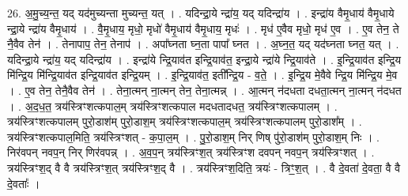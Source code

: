 \documentclass[17pt]{extarticle}
\begin{document}
26. अ॒मु॒च्य॒न्त॒ यद् यद॑मुच्यन्ता मुच्यन्त॒ यत् । . यदिन्द्रा॒ये न्द्रा॑य॒ यद् यदिन्द्रा॑य । . इन्द्रा॑य वैमृ॒धाय॑ वैमृ॒धाये न्द्रा॒ये न्द्रा॑य वैमृ॒धाय॑ । . वै॒मृ॒धाय॒ मृधो॒ मृधो॑ वैमृ॒धाय॑ वैमृ॒धाय॒ मृधः॑ । . मृध॑ ए॒वैव मृधो॒ मृध॑ ए॒व । . ए॒व तेन॒ ते नै॒वैव तेन॑ । . तेनापाप॒ तेन॒ तेनाप॑ । . अपा᳚घ्नता घ्न॒ता पापा᳚ घ्नत । . अ॒घ्न॒त॒ यद् यद॑घ्नता घ्नत॒ यत् । . यदिन्द्रा॒ये न्द्रा॑य॒ यद् यदिन्द्रा॑य । . इन्द्रा॑ये न्द्रि॒याव॑त इन्द्रि॒याव॑त॒ इन्द्रा॒ये न्द्रा॑ये न्द्रि॒याव॑ते । . इ॒न्द्रि॒याव॑त इन्द्रि॒य मि॑न्द्रि॒य मि॑न्द्रि॒याव॑त इन्द्रि॒याव॑त इन्द्रि॒यम् । . इ॒न्द्रि॒याव॑त॒ इती᳚न्द्रि॒य - व॒ते॒ । . इ॒न्द्रि॒य मे॒वैवे न्द्रि॒य मि॑न्द्रि॒य मे॒व । . ए॒व तेन॒ तेनै॒वैव तेन॑ । . तेना॒त्मन् ना॒त्मन् तेन॒ तेना॒त्मन्न् । . आ॒त्मन् न॑दधता दधता॒त्मन् ना॒त्मन् न॑दधत । . अ॒द॒ध॒त॒ त्रय॑स्त्रिꣳशत्कपाल॒म् त्रय॑स्त्रिꣳशत्कपाल मदधतादधत॒ त्रय॑स्त्रिꣳशत्कपालम् । . त्रय॑स्त्रिꣳशत्कपालम् पुरो॒डाश॑म् पुरो॒डाश॒म् त्रय॑स्त्रिꣳशत्कपाल॒म् त्रय॑स्त्रिꣳशत्कपालम् पुरो॒डाश᳚म् । . त्रय॑स्त्रिꣳशत्कपाल॒मिति॒ त्रय॑स्त्रिꣳशत् - क॒पा॒ल॒म् । . पु॒रो॒डाश॒म् निर् णिष् पु॑रो॒डाश॑म् पुरो॒डाश॒म् निः । . निर॑वपन् नवप॒न् निर् णिर॑वपन्न् । . अ॒व॒प॒न् त्रय॑स्त्रिꣳश॒त् त्रय॑स्त्रिꣳश दवपन् नवप॒न् त्रय॑स्त्रिꣳशत् । . त्रय॑स्त्रिꣳश॒द् वै वै त्रय॑स्त्रिꣳश॒त् त्रय॑स्त्रिꣳश॒द् वै । . त्रय॑स्त्रिꣳश॒दिति॒ त्रयः॑ - त्रिꣳ॒॒श॒त् । . वै दे॒वता॑ दे॒वता॒ वै वै दे॒वताः᳚ । \newline
\end{document}
